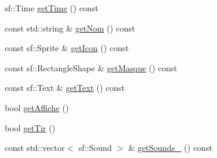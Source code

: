 \begin{DoxyCompactItemize}
\item 
sf\+::\+Time \mbox{\hyperlink{class_capacite_ad14b4e98b6d30717a40f8b57a56af085}{get\+Time}} () const
\item 
const std\+::string \& \mbox{\hyperlink{class_capacite_a36ba3cb1e9a72586dff32fa7f0df85cf}{get\+Nom}} () const
\item 
const sf\+::\+Sprite \& \mbox{\hyperlink{class_capacite_aa66c20bba4433f871c91c3836a0c1929}{get\+Icon}} () const
\item 
const sf\+::\+Rectangle\+Shape \& \mbox{\hyperlink{class_capacite_a4585b46b989301b127a93dc062a0b8aa}{get\+Masque}} () const
\item 
const sf\+::\+Text \& \mbox{\hyperlink{class_capacite_a91f1a5f98354c08f75caf99b0513d3c4}{get\+Text}} () const
\item 
bool \mbox{\hyperlink{class_capacite_a6dd5ea561e52140a345be7e62a33cf1f}{get\+Affiche}} ()
\item 
bool \mbox{\hyperlink{class_capacite_a40152147df357f3c0d9ea1116b0f7241}{get\+Tir}} ()
\item 
const std\+::vector$<$ sf\+::\+Sound $>$ \& \mbox{\hyperlink{class_capacite_aec0e0991421f2675830b7234fe494709}{get\+Sounds\+\_\+}} () const
\end{DoxyCompactItemize}
